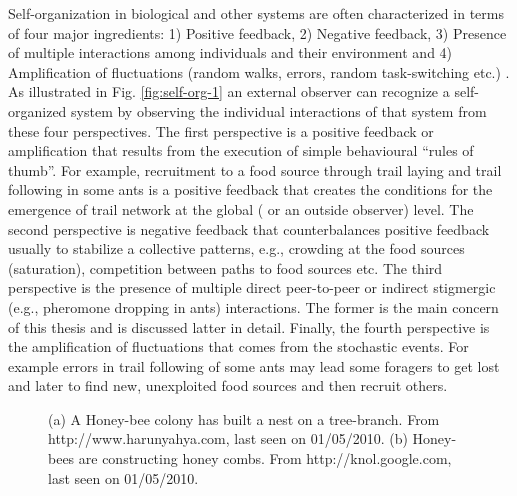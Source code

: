 Self-organization in biological and  other systems are often characterized in terms of four major ingredients: 1) Positive feedback, 2) Negative feedback, 3) Presence of multiple interactions among individuals and their environment and 4) Amplification of fluctuations  (random walks, errors, random task-switching etc.) \cite{Bonabeau+1999,Camazine+2001}. As illustrated in Fig. \ref{fig:self-org-1} an external observer can recognize a self-organized system by observing the individual interactions of that system from these four perspectives. The first perspective is a positive feedback or amplification that results from the execution of simple behavioural ``rules of thumb''. For example, recruitment to a food source through trail laying and trail following in some ants  is a positive feedback that creates the conditions for the emergence of trail network at the global ( or an outside observer) level. The second perspective is negative feedback that counterbalances positive feedback usually to stabilize a collective patterns, e.g., crowding at the food sources (saturation), competition between paths to food sources etc. The third perspective is the presence of multiple direct peer-to-peer or indirect stigmergic (e.g., pheromone dropping in ants) interactions. The former is the main concern of this thesis and is discussed latter in detail. Finally, the fourth  perspective is the amplification of fluctuations that comes from the stochastic events. For example errors in trail following of some ants may lead some foragers to get lost and later to find new, unexploited food sources and then recruit others. 
\begin{figure}
\centering
{} 
\hspace{0.25cm}
\caption{(a) A Honey-bee colony has built a nest on a tree-branch. From http://www.harunyahya.com, last seen on 01/05/2010. (b) Honey-bees are constructing honey combs. From http://knol.google.com, last seen on 01/05/2010.}
\label{fig:honey-bee-nest}
\end{figure}
%
